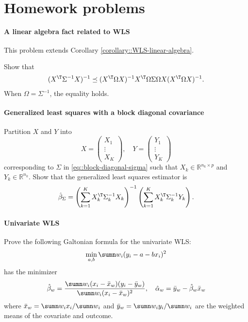  

\section{Homework problems}
\label{sec::homework-problems}
 
 
\paragraph{A linear algebra fact related to WLS}\label{hw16::linear-algebra-wls} 
 
This problem extends Corollary \ref{corollary::WLS-linear-algebra}.

Show that 
$$
(X^{\T}  \Sigma^{-1}  X) ^{-1} 
\preceq
(X^{\T}  \Omega  X)^{-1}X^{\T}   \Omega  \Sigma   \Omega X(X^{\T}   \Omega  X)^{-1}.
$$
When $ \Omega = \Sigma^{-1}$, the equality holds.  
 

\paragraph{Generalized least squares with a block diagonal covariance}\label{hw16::gls-block-cov}

Partition $X$ and $Y$ into 
$$
X =  \begin{pmatrix}
X_1\\
\vdots \\
X_K
\end{pmatrix},\quad
Y = \begin{pmatrix}
Y_1\\
\vdots\\
Y_K
\end{pmatrix}
$$
corresponding to $\Sigma$ in \eqref{eq::block-diagonal-sigma} such that $X_k  \in \mathbb{R}^{ n_k\times p}$ and $Y_k\in  \mathbb{R}^{n_k}$. Show that the generalized least squares estimator is
$$
\hat{\beta}_\Sigma = \left(\sum_{k=1}^K X_k ^{\T} \Sigma_k^{-1} X_k \right)^{-1} \left( \sum_{k=1}^K X_k ^{\T} \Sigma_k^{-1} Y_k \right).
$$


\paragraph{Univariate WLS}\label{hw16::univariate-wls}


Prove the following Galtonian formula for the univariate WLS:
$$
\min_{a,b}
\sumn w_i (y_i - a - b x_i)^2
$$
has the minimizer
$$
\hat{\beta}_w = \frac{ \sumn w_i(x_i - \bar{x}_w) (y_i - \bar{y}_w) }{ \sumn w_i(x_i - \bar{x}_w)^2  },\quad 
\hat\alpha_w = \bar{y}_w - \hat{\beta}_w  \bar{x}_w
$$
where $ \bar{x}_w = \sumn w_i x_i /  \sumn w_i   $ and $ \bar{y}_w = \sumn w_i y_i /  \sumn w_i $ are the weighted means of the covariate and outcome.



